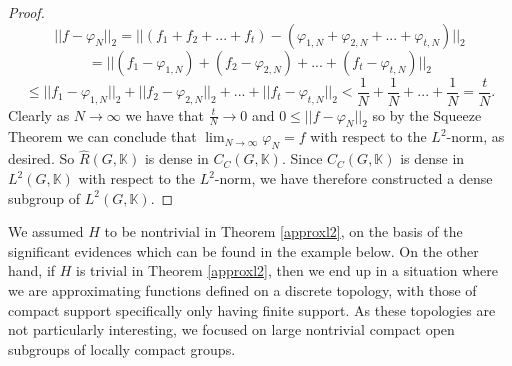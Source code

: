 \documentclass{amsart}
\theoremstyle{definition}
\numberwithin{equation}{section}
\newcommand{\lck}{L^2 (G,\mathbb{K})}
\newcommand{\cck}{C_C (G,\mathbb{K})}
\newcommand{\rhgk}{\hat{R}(G,\K)}
\newcommand{\K}{\mathbb{K}}
\begin{document}
\begin{proof}
 \[ ||f-\varphi_N||_2 =||(f_1+f_2+...+f_t)-(\varphi_{1,N}+\varphi_{2,N}+...+\varphi_{t,N})||_2\]
\[ =||(f_1-\varphi_{1,N})+(f_2-\varphi_{2,N})+...+(f_t-\varphi_{t,N})||_2 \]
\[ \leq||f_1-\varphi_{1,N}||_2+||f_2-\varphi_{2,N}||_2+...+||f_t-\varphi_{t,N}||_2 <\frac{1}{N}+\frac{1}{N}+...+\frac{1}{N}=\frac{t}{N}.\] 
 Clearly as $N\rightarrow\infty$ we have that $\frac{t}{N}\rightarrow 0$ and $0 \leq ||f-\varphi_N||_2$ so by the Squeeze Theorem we can conclude that $\lim_{N\rightarrow\infty} \varphi_{N}=f$ with respect to the $L^2$-norm, as desired. So $\rhgk$ is dense in $\cck$. Since $\cck$ is dense in $\lck$ with respect to the $L^2$-norm, we have therefore constructed a dense subgroup of $\lck$. \end{proof}

We assumed $H$ to be nontrivial in Theorem \ref{approxl2}, on the basis of the significant evidences which can be found in the example below. On the other hand, if $H$ is trivial in Theorem \ref{approxl2}, then we end up in a situation where we are approximating functions defined on a discrete topology, with those of compact  support specifically only having finite support. As these topologies are not particularly interesting, we focused on large nontrivial compact open subgroups of locally compact groups.
\end{document}
